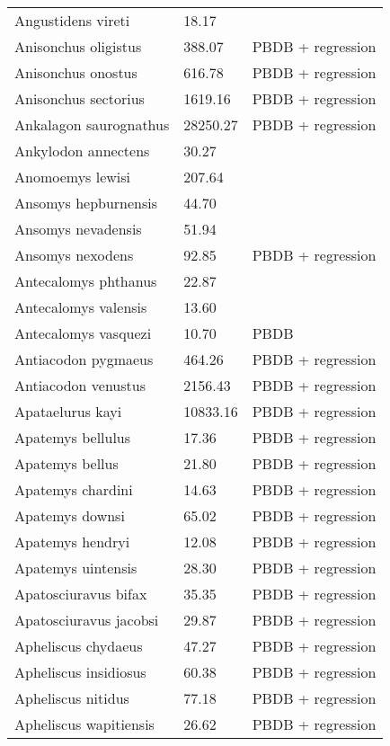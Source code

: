 \begin{center}
\begin{longtable}{p{} p{} p{} }
  Angustidens vireti & 18.17 & \cite{Tomiya2013} \\ 
  Anisonchus oligistus & 388.07 & PBDB + regression \\ 
  Anisonchus onostus & 616.78 & PBDB + regression \\ 
  Anisonchus sectorius & 1619.16 & PBDB + regression \\ 
  Ankalagon saurognathus & 28250.27 & PBDB + regression \\ 
  Ankylodon annectens & 30.27 & \cite{Tomiya2013} \\ 
  Anomoemys lewisi & 207.64 & \cite{Simons1960} \\ 
  Ansomys hepburnensis & 44.70 & \cite{Tomiya2013} \\ 
  Ansomys nevadensis & 51.94 & \cite{Tomiya2013} \\ 
  Ansomys nexodens & 92.85 & PBDB + regression \\ 
  Antecalomys phthanus & 22.87 & \cite{Tomiya2013} \\ 
  Antecalomys valensis & 13.60 & \cite{Tomiya2013} \\ 
  Antecalomys vasquezi & 10.70 & PBDB \\ 
  Antiacodon pygmaeus & 464.26 & PBDB + regression \\ 
  Antiacodon venustus & 2156.43 & PBDB + regression \\ 
  Apataelurus kayi & 10833.16 & PBDB + regression \\ 
  Apatemys bellulus & 17.36 & PBDB + regression \\ 
  Apatemys bellus & 21.80 & PBDB + regression \\ 
  Apatemys chardini & 14.63 & PBDB + regression \\ 
  Apatemys downsi & 65.02 & PBDB + regression \\ 
  Apatemys hendryi & 12.08 & PBDB + regression \\ 
  Apatemys uintensis & 28.30 & PBDB + regression \\ 
  Apatosciuravus bifax & 35.35 & PBDB + regression \\ 
  Apatosciuravus jacobsi & 29.87 & PBDB + regression \\ 
  Apheliscus chydaeus & 47.27 & PBDB + regression \\ 
  Apheliscus insidiosus & 60.38 & PBDB + regression \\ 
  Apheliscus nitidus & 77.18 & PBDB + regression \\ 
  Apheliscus wapitiensis & 26.62 & PBDB + regression \\ 

\end{longtable}
\end{center}
